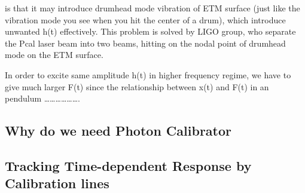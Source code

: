  is that it may introduce drumhead mode vibration of ETM surface (just like the vibration mode you see when you hit the center of a drum), which introduce unwanted h(t) effectively. This problem is solved by LIGO group\cite{pcal:karki2016}, who separate the Pcal laser beam into two beams, hitting on the nodal point of drumhead mode on the ETM surface\cite{pcal:Daveloza2012}.  


In order to excite same amplitude h(t) in higher frequency regime, we have to give much larger F(t) since the relationship between x(t) and F(t) in an pendulum ……………….



\subsection{Why do we need Photon Calibrator}
\subsection{Tracking Time-dependent Response by Calibration lines}

